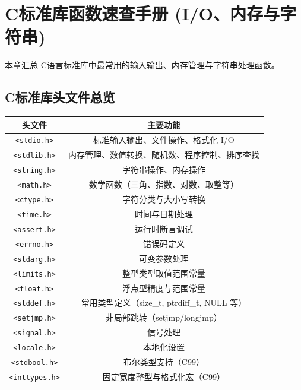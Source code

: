 \clearpage
\begingroup
\let\clearpage\relax
\let\cleardoublepage\relax
\vspace*{\fill}
\chapter{C标准库函数速查手册 (I/O、内存与字符串)}
\begin{center}
本章汇总 C语言标准库中最常用的输入输出、内存管理与字符串处理函数。
\end{center}
\vspace*{\fill}
\endgroup
\clearpage


\section{C标准库头文件总览}

\begin{table}[H]
\centering
\small
\renewcommand{\arraystretch}{1.5}
\begin{tabulary}{\linewidth}{CC}
\toprule
\textbf{头文件} & \textbf{主要功能} \\ \midrule
\texttt{<stdio.h>} & 标准输入输出、文件操作、格式化 I/O \\ 
\texttt{<stdlib.h>} & 内存管理、数值转换、随机数、程序控制、排序查找 \\ 
\texttt{<string.h>} & 字符串操作、内存操作 \\ 
\texttt{<math.h>} & 数学函数（三角、指数、对数、取整等） \\ 
\texttt{<ctype.h>} & 字符分类与大小写转换 \\ 
\texttt{<time.h>} & 时间与日期处理 \\ 
\texttt{<assert.h>} & 运行时断言调试 \\ 
\texttt{<errno.h>} & 错误码定义 \\ 
\texttt{<stdarg.h>} & 可变参数处理 \\ 
\texttt{<limits.h>} & 整型类型取值范围常量 \\ 
\texttt{<float.h>} & 浮点型精度与范围常量 \\ 
\texttt{<stddef.h>} & 常用类型定义（size\_t, ptrdiff\_t, NULL 等） \\ 
\texttt{<setjmp.h>} & 非局部跳转（setjmp/longjmp） \\ 
\texttt{<signal.h>} & 信号处理 \\ 
\texttt{<locale.h>} & 本地化设置 \\ 
\texttt{<stdbool.h>} & 布尔类型支持（C99） \\ 
\texttt{<inttypes.h>} & 固定宽度整型与格式化宏（C99） \\ 

\end{tabulary}
\end{table}
